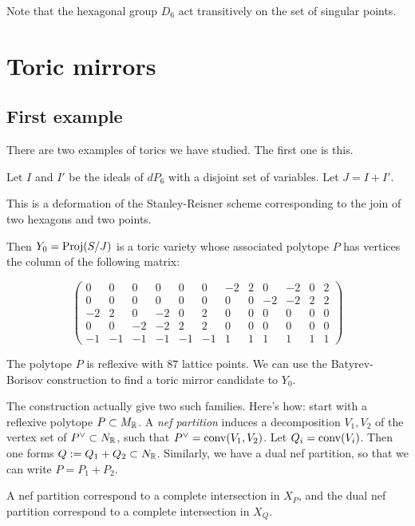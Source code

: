 \documentclass[11pt, english]{article}
\begin{document}
Note that the hexagonal group $D_6$ act transitively on the set of singular points.

\section{Toric mirrors}

\subsection{First example}

There are two examples of torics we have studied. The first one is this.

Let $I$ and $I'$ be the ideals of $dP_6$ with a disjoint set of variables. Let $J=I+I'$.

\begin{remark}
This is a deformation of the Stanley-Reisner scheme corresponding to the join of two hexagons and two points.
\end{remark}

Then $Y_0 = \operatorname{Proj}(S/J)$ is a toric variety whose associated polytope $P$ has vertices the column of the following matrix:

\begin{equation}
\left(
\begin{array}{rrrrrrrrrrrr}
0 & 0 & 0 & 0 & 0 & 0 & -2 & 2 & 0 & -2 & 0 & 2 \\
0 & 0 & 0 & 0 & 0 & 0 & 0 & 0 & -2 & -2 & 2 & 2 \\
-2 & 2 & 0 & -2 & 0 & 2 & 0 & 0 & 0 & 0 & 0 & 0 \\
0 & 0 & -2 & -2 & 2 & 2 & 0 & 0 & 0 & 0 & 0 & 0 \\
-1 & -1 & -1 & -1 & -1 & -1 & 1 & 1 & 1 & 1 & 1 & 1
\end{array}
\right)
\end{equation}

The polytope $P$ is reflexive with $87$ lattice points. We can use the Batyrev-Borisov construction to find a toric mirror candidate to $Y_0$.

The construction actually give two such families. Here's how: start with a reflexive polytope $P \subset M_{\mathbb{R}}$. A \emph{nef partition} induces a decomposition $V_1,V_2$ of the vertex set of $P^\vee \subset N_{\mathbb{R}}$, such that $P^\vee = \operatorname{conv}(V_1,V_2)$. Let $Q_i = \operatorname{conv}(V_i)$. Then one forms $Q := Q_1+Q_2 \subset N_{\mathbb{R}}$. Similarly, we have a dual nef partition, so that we can write $P = P_1 + P_2$.

A nef partition correspond to a complete intersection in $X_P$, and the dual nef partition correspond to a complete intersection in $X_Q$. 
\end{document}
